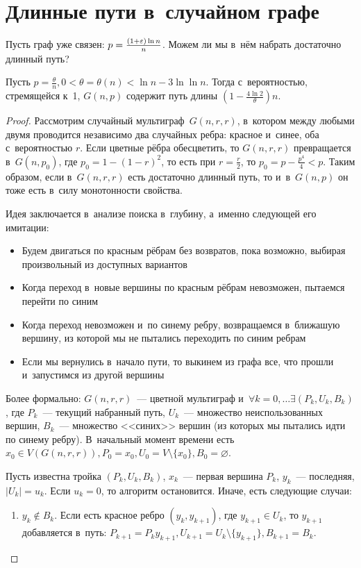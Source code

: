\documentclass{article}
\begin{document}
\section{Длинные пути в~случайном графе}

Пусть граф уже связен: $p = \frac{(1 + \varepsilon) \ln n}{n}$. Можем ли мы в~нём набрать достаточно
длинный путь?

\begin{theorem}
	Пусть $p = \frac{\theta}{n}, 0 < \theta = \theta(n) < \ln n - 3 \ln \ln n$. Тогда с~вероятностью,
	стремящейся к~1, $G(n, p)$ содержит путь длины $(1 - \frac{4\ln2}{\theta}) n$.
\end{theorem}
\begin{proof}
	Рассмотрим случайный мультиграф~$G(n, r, r)$, в~котором между любыми двумя
	проводится независимо два случайных ребра: красное и~синее, оба с~вероятностью $r$. Если цветные
	рёбра обесцветить, то $G(n, r, r)$ превращается в~$G(n, p_0)$, где $p_0 = 1 - (1 - r)^2$, то есть
	при $r = \frac{r}{2}$, то $p_0 = p - \frac{p^4}{4} < p$. Таким образом, если в~$G(n, r, r)$ есть
	достаточно длинный путь, то и~в~$G(n, p)$ он тоже есть в~силу монотонности свойства.

	Идея заключается в~анализе поиска в~глубину, а~именно следующей его имитации:
	\begin{itemize}
		\item Будем двигаться по красным рёбрам без возвратов, пока возможно, выбирая произвольный из
			доступных вариантов
		\item Когда переход в~новые вершины по красным рёбрам невозможен, пытаемся перейти по синим
		\item Когда переход невозможен и~по синему ребру, возвращаемся в~ближашую вершину, из которой мы
			не пытались переходить по синим ребрам
		\item Если мы вернулись в~начало пути, то выкинем из графа все, что прошли и~запустимся из
			другой вершины
	\end{itemize}

	Более формально: $G(n, r, r)$~--- цветной мультиграф и~$\forall k=0, \ldots \exists (P_k, U_k,
	B_k)$, где $P_k$~--- текущий набранный путь, $U_k$~--- множество неиспользованных вершин,
	$B_k$~--- множество <<синих>> вершин (из которых мы пытались идти по синему ребру). В~начальный
	момент времени есть $x_0 \in V(G(n, r, r)), P_0 = x_0, U_0 = V \setminus \{x_0\}, B_0 =
	\varnothing$.

	Пусть известна тройка $(P_k, U_k, B_k)$, $x_k$~--- первая вершина $P_k$, $y_k$~---
	последняя, $|U_k| = u_k$. Если $u_k = 0$, то алгоритм остановится. Иначе, есть следующие случаи:
	\begin{enumerate}
		\item $y_k \notin B_k$. Если есть красное ребро $(y_k, y_{k+1})$, где $y_{k+1} \in U_k$, то
			$y_{k+1}$ добавляется в~путь: $P_{k+1} = P_k y_{k+1}, U_{k+1} = U_k \setminus \{y_{k+1}\},
			B_{k+1} = B_k$.


\end{enumerate}
\end{proof}
\end{document}
